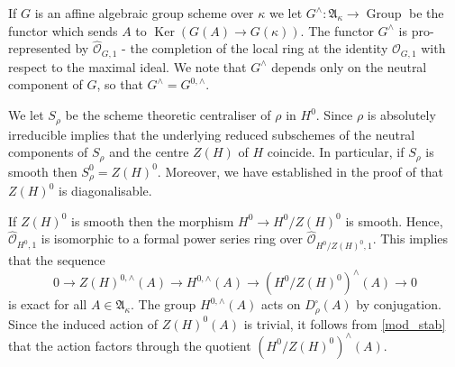 \documentclass{amsart}
\theoremstyle{definition}
\theoremstyle{remark}
\DeclareMathOperator{\Ker}{Ker}
\newcommand{\OO}{\mathcal O}
\DeclareMathOperator{\Group}{Group}
\begin{document}
If $G$ is an affine algebraic group scheme over $\kappa$ we let $G^{\wedge}: \mathfrak A_{\kappa}\rightarrow \Group$ be the functor which sends $A$ to 
$\Ker(G(A)\rightarrow G(\kappa))$. The
functor $G^{\wedge}$ is pro-represented by $\widehat{\OO}_{G,1}$ - the completion of the local ring at the identity $\OO_{G, 1}$ with respect to the maximal ideal.
We note that  $G^{\wedge}$ depends
only on the neutral component of $G$, so that 
$G^{\wedge}=G^{0,\wedge}$.

We let $S_{\rho}$ be the scheme 
theoretic centraliser of $\rho$ in $H^0$.
Since $\rho$ is absolutely irreducible  \cite[Proposition 9.7]{defG} implies that 
the underlying reduced subschemes of the neutral components of $S_{\rho}$ and 
the centre $Z(H)$ of $H$ coincide. In particular, if $S_{\rho}$ is smooth then $S_{\rho}^0=Z(H)^0$. Moreover, we have established in the proof of \cite[Proposition 2.9]{defG} that $Z(H)^0$ is diagonalisable. 

If $Z(H)^0$ is smooth  then the morphism  $H^0\rightarrow
H^0/Z(H)^0$ is smooth.
Hence, $\widehat{\OO}_{H^0, 1}$ is isomorphic to a formal power series ring over 
$\widehat{\OO}_{H^0/Z(H)^0, 1}$. 
This implies that the sequence 
\begin{equation}\label{mod_stab}
0\rightarrow Z(H)^{0,\wedge}(A)\rightarrow H^{0,\wedge}(A)\rightarrow (H^0/Z(H)^0)^{\wedge}(A)\rightarrow 0 \end{equation}
is exact for all $A\in \mathfrak A_{\kappa}$. The group $H^{0, \wedge}(A)$ acts on $D^{\square}_{\rho}(A)$ by conjugation. Since the induced action of $Z(H)^0(A)$ is trivial, it follows from \eqref{mod_stab} that the action factors through 
the quotient $(H^0/Z(H)^0)^{\wedge}(A)$.
\end{document}
